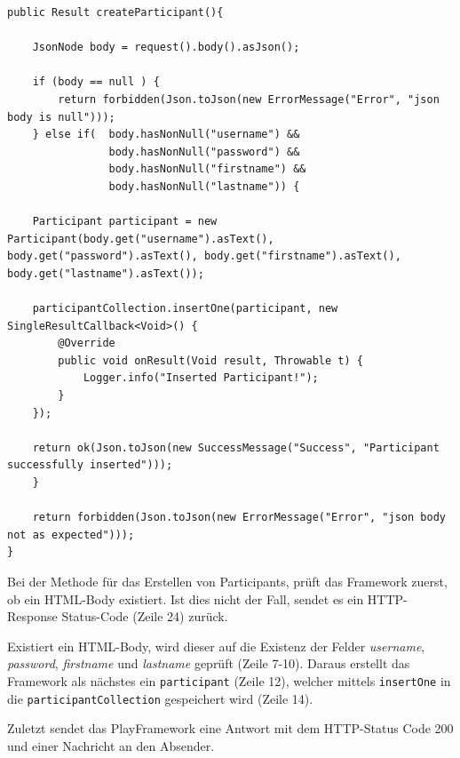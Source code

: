 \lstset{language=JAVA, showstringspaces=false, frame=single, captionpos=b, label=createParticipant, breaklines=true, numbers=left}
\begin{lstlisting}[caption={Participant erstellen}, label=participantErstellen]
public Result createParticipant(){

    JsonNode body = request().body().asJson();

    if (body == null ) {
        return forbidden(Json.toJson(new ErrorMessage("Error", "json body is null")));
    } else if(  body.hasNonNull("username") &&
            	body.hasNonNull("password") &&
            	body.hasNonNull("firstname") &&
            	body.hasNonNull("lastname")) {

    Participant participant = new Participant(body.get("username").asText(), body.get("password").asText(), body.get("firstname").asText(), body.get("lastname").asText());

    participantCollection.insertOne(participant, new SingleResultCallback<Void>() {
        @Override
        public void onResult(Void result, Throwable t) {
            Logger.info("Inserted Participant!");
        }
    });

    return ok(Json.toJson(new SuccessMessage("Success", "Participant successfully inserted")));
    }

    return forbidden(Json.toJson(new ErrorMessage("Error", "json body not as expected")));
}
\end{lstlisting}

Bei der Methode für das Erstellen von Participants, prüft das Framework zuerst, ob ein HTML-Body existiert. Ist dies nicht der Fall, sendet es ein HTTP-Response Status-Code (Zeile 24) zurück.

Existiert ein HTML-Body, wird dieser auf die Existenz der Felder \textit{username}, \textit{password}, \textit{firstname} und \textit{lastname} geprüft (Zeile 7-10). Daraus erstellt das Framework als nächstes ein \texttt{participant} (Zeile 12), welcher mittels  \texttt{insertOne} in die \texttt{participant\-Collection} gespeichert wird (Zeile 14).

Zuletzt sendet das PlayFramework eine Antwort mit dem HTTP-Status Code 200 und einer Nachricht an den Absender. 

